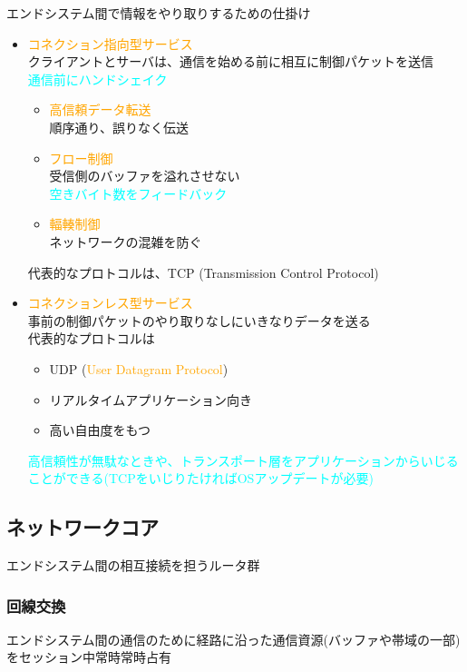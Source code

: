 エンドシステム間で情報をやり取りするための仕掛け
\begin{itemize}
  \item \textcolor{orange}{コネクション指向型サービス}\\
    クライアントとサーバは、通信を始める前に相互に制御パケットを送信\\
    \textcolor{cyan}{通信前にハンドシェイク}
    \begin{itemize}
      \item \textcolor{orange}{高信頼データ転送}\\
        順序通り、誤りなく伝送
      \item \textcolor{orange}{フロー制御}\\
        受信側のバッファを溢れさせない\\
        \textcolor{cyan}{空きバイト数をフィードバック}
      \item \textcolor{orange}{輻輳制御}\\
        ネットワークの混雑を防ぐ
    \end{itemize}
    代表的なプロトコルは、TCP (Transmission Control Protocol)
  \item \textcolor{orange}{コネクションレス型サービス}\\
    事前の制御パケットのやり取りなしにいきなりデータを送る\\
    代表的なプロトコルは
    \begin{itemize}
      \item UDP (\textcolor{orange}{User Datagram Protocol})
      \item リアルタイムアプリケーション向き
      \item 高い自由度をもつ
    \end{itemize}
    \textcolor{cyan}{高信頼性が無駄なときや、トランスポート層をアプリケーションからいじることができる(TCPをいじりたければOSアップデートが必要)}
\end{itemize}

\newpage
\subsection{ネットワークコア}
エンドシステム間の相互接続を担うルータ群


\subsubsection{回線交換}
エンドシステム間の通信のために経路に沿った通信資源(バッファや帯域の一部)をセッション中常時常時占有

